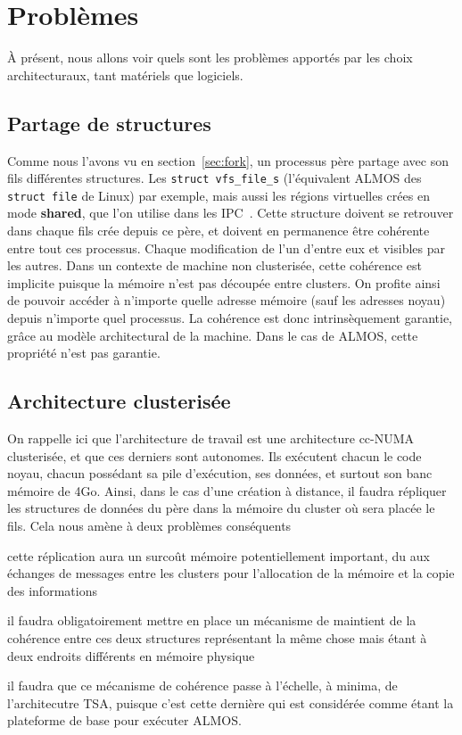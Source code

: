 \section{Problèmes} \label{sec:problem}

  À présent, nous allons voir quels sont les problèmes apportés par les choix
  architecturaux, tant matériels que logiciels.

  \subsection{Partage de structures}

    Comme nous l'avons vu en section~\ref{sec:fork}, un processus père partage
    avec son fils différentes structures. Les \texttt{struct vfs\_file\_s}
    (l'équivalent ALMOS des \texttt{struct file} de Linux) par exemple, mais
    aussi les régions virtuelles crées en mode \textbf{shared}, que l'on utilise
    dans les IPC~\cite{ipc}. Cette structure doivent se retrouver dans chaque
    fils crée depuis ce père, et doivent en permanence être cohérente entre tout
    ces processus. Chaque modification de l'un d'entre eux et visibles par les
    autres. Dans un contexte de machine non clusterisée, cette cohérence est
    implicite puisque la mémoire n'est pas découpée entre clusters. On profite
    ainsi de pouvoir accéder à n'importe quelle adresse mémoire (sauf les
    adresses noyau) depuis n'importe quel processus. La cohérence est donc
    intrinsèquement garantie, grâce au modèle architectural de la machine. Dans
    le cas de ALMOS, cette propriété n'est pas garantie.


  \subsection{Architecture clusterisée}

    On rappelle ici que l'architecture de travail est une architecture cc-NUMA
    clusterisée, et que ces derniers sont autonomes. Ils exécutent chacun le
    code noyau, chacun possédant sa pile d'exécution, ses données, et surtout
    son banc mémoire de 4Go. Ainsi, dans le cas d'une création à distance, il
    faudra répliquer les structures de données du père dans la mémoire du
    cluster où sera placée le fils. Cela nous amène à deux problèmes conséquents
    \benumline \item cette réplication aura un surcoût mémoire potentiellement
    important, du aux échanges de messages entre les clusters pour l'allocation
  de la mémoire et la copie des informations \item il faudra obligatoirement
    mettre en place un mécanisme de maintient de la cohérence entre ces deux
  structures représentant la même chose mais étant à deux endroits différents en
mémoire physique \item il faudra que ce mécanisme de cohérence passe à
  l'échelle, à minima, de l'architecutre TSA, puisque c'est cette dernière qui
  est considérée comme étant la plateforme de base pour exécuter
  ALMOS\eenumline.


  \subsection{}

